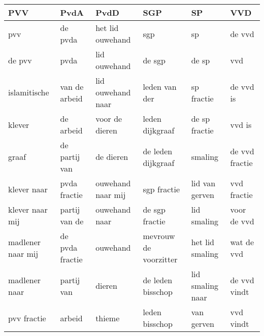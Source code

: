 \begin{tabular}{llllll}
\toprule
               PVV &             PvdA &               PvdD &                    SGP &                SP &             VVD \\
\midrule
               pvv &          de pvda &   het lid ouwehand &                    sgp &                sp &          de vvd \\
            de pvv &             pvda &       lid ouwehand &                 de sgp &             de sp &             vvd \\
      islamitische &    van de arbeid &  lid ouwehand naar &          leden van der &        sp fractie &       de vvd is \\
            klever &        de arbeid &     voor de dieren &        leden dijkgraaf &     de sp fractie &          vvd is \\
             graaf &    de partij van &          de dieren &     de leden dijkgraaf &           smaling &  de vvd fractie \\
       klever naar &     pvda fractie &  ouwehand naar mij &            sgp fractie &    lid van gerven &     vvd fractie \\
   klever naar mij &    partij van de &      ouwehand naar &         de sgp fractie &       lid smaling &     voor de vvd \\
 madlener naar mij &  de pvda fractie &           ouwehand &  mevrouw de voorzitter &   het lid smaling &      wat de vvd \\
     madlener naar &       partij van &             dieren &      de leden bisschop &  lid smaling naar &    de vvd vindt \\
       pvv fractie &           arbeid &             thieme &         leden bisschop &        van gerven &       vvd vindt \\
\bottomrule
\end{tabular}
